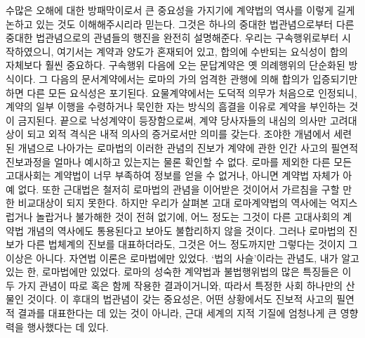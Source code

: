 수많은 오해에 대한 방패막이로서 큰 중요성을 가지기에
계약법의 역사를
이렇게
길게 논하고 있는 것도 이해해주시리라 믿는다.
그것은 하나의 중대한 법관념으로부터
다른 중대한 법관념으로의 관념들의 행진을 완전히 설명해준다.
우리는 구속행위로부터 시작하였으니,
여기서는 계약과 양도가 혼재되어 있고,
합의에 수반되는 요식성이 합의 자체보다 훨씬 중요하다.
구속행위 다음에 오는 문답계약은 옛 의례행위의 단순화된 방식이다.
그 다음의 문서계약에서는
로마의 가의 엄격한 관행에 의해
합의가 입증되기만 하면 다른 모든 요식성은 포기된다.
요물계약에서는 도덕적 의무가 처음으로 인정되니,
계약의 일부 이행을 수령하거나 묵인한 자는
방식의 흠결을 이유로 계약을 부인하는 것이 금지된다.
끝으로 낙성계약이 등장함으로써,
계약 당사자들의 내심의 의사만 고려대상이 되고
외적 격식은 내적 의사의 증거로서만 의미를 갖는다.
조야한 개념에서 세련된 개념으로 나아가는 로마법의 이러한 관념의 진보가
계약에 관한 인간 사고의 필연적 진보과정을 얼마나 예시하고 있는지는
물론 확인할 수 없다.
로마를 제외한 다른 모든 고대사회는
계약법이 너무 부족하여 정보를 얻을 수 없거나,
아니면 계약법 자체가 아예 없다.
또한 근대법은 철저히 로마법의 관념을 이어받은 것이어서
가르침을 구할 만한 비교대상이 되지 못한다.
하지만 우리가 살펴본 고대 로마계약법의 역사에는
억지스럽거나 놀랍거나 불가해한 것이 전혀 없기에,
어느 정도는 그것이
다른 고대사회의 계약법 개념의 역사에도 통용된다고
보아도 불합리하지 않을 것이다.
그러나 로마법의 진보가 다른 법체계의 진보를 대표하더라도,
그것은 어느 정도까지만 그렇다는 것이지 그 이상은 아니다.
자연법 이론은 로마법에만 있었다.
`법의 사슬'이라는 관념도, 내가 알고 있는 한,
로마법에만 있었다.
로마의 성숙한 계약법과 불법행위법의 많은 특징들은
이 두 가지  관념이 따로 혹은 함께 작용한 결과이거니와,
따라서 특정한 사회 하나만의 산물인 것이다.
이 후대의 법관념이 갖는 중요성은,
어떤 상황에서도 진보적 사고의 필연적 결과를 대표한다는 데
있는 것이 아니라,
근대 세계의 지적 기질에 엄청나게 큰 영향력을 행사했다는 데 있다.

